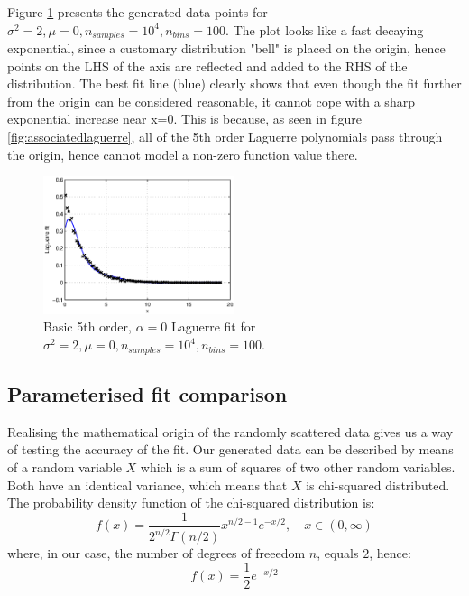 \documentclass[a4paper]{article}
\numberwithin{equation}{section}
\begin{document}
\noindent Figure \ref{fig:basicfit} presents the generated data points for $\sigma^2=2, \mu=0, n_{samples}=10^4, n_{bins}=100$. The plot looks like a fast decaying exponential, since a customary distribution "bell" is placed on the origin, hence points on the LHS of the axis are reflected and added to the RHS of the distribution. The best fit line (blue) clearly shows that even though the fit further from the origin can be considered reasonable, it cannot cope with a sharp exponential increase near x=0. This is because, as seen in figure \ref{fig:associatedlaguerre}, all of the 5th order Laguerre polynomials pass through the origin, hence cannot model a non-zero function value there.

\begin{figure}[!h]
\centering
\includegraphics[width=0.5\textwidth]{basic_fit.eps}
\caption{\label{fig:basicfit}Basic 5th order, $\alpha=0$ Laguerre fit for $\sigma^2=2, \mu=0, n_{samples}=10^4, n_{bins}=100$.}
\end{figure}

\subsection{Parameterised fit comparison}
Realising the mathematical origin of the randomly scattered data gives us a way of testing the accuracy of the fit. Our generated data can be described by means of a random variable $X$ which is a sum of squares of two other random variables. Both have an identical variance, which means that $X$ is chi-squared distributed. The probability density function of the chi-squared distribution is:
\begin{equation}
f(x) = \frac{1}{2^{n/2} \Gamma(n/2)}x^{n/2-1} e^{-x/2}, \quad x \in (0, \infty)
\end{equation}
where, in our case, the number of degrees of freeedom $n$, equals $2$, hence:
\begin{equation}
f(x) = \frac{1}{2} e^{-x/2}
\end{equation}
\end{document}

